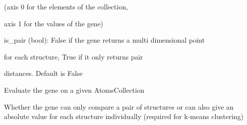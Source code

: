 \documentclass[letterpaper,10pt,english]{sphinxmanual}
\begin{document}
\begin{fulllineitems}
\begin{DUlineblock}{0em}
\begin{DUlineblock}{\DUlineblockindent}
\begin{DUlineblock}{\DUlineblockindent}
\begin{DUlineblock}{\DUlineblockindent}
\item[] (axis 0 for the elements of the collection,
\item[]
\begin{DUlineblock}{\DUlineblockindent}
\item[] axis 1 for the values of the gene)
\end{DUlineblock}
\end{DUlineblock}
\end{DUlineblock}
\item[] is\_pair (bool): False if the gene returns a multi dimensional point
\item[]
\begin{DUlineblock}{\DUlineblockindent}
\item[] for each structure, True if it only returns pair
\item[] distances. Default is False
\end{DUlineblock}
\end{DUlineblock}
\end{DUlineblock}

\begin{fulllineitems}
\label{doctree/soprano.analyse.phylogen.genes:soprano.analyse.phylogen.genes.Gene.evaluate}
Evaluate the gene on a given AtomsCollection

\end{fulllineitems}


\begin{fulllineitems}
\label{doctree/soprano.analyse.phylogen.genes:soprano.analyse.phylogen.genes.Gene.is_pair}
Whether the gene can only compare a pair of structures or can also
give an absolute value for each structure individually (required for
k-means clustering)

\end{fulllineitems}


\end{fulllineitems}

\end{document}
